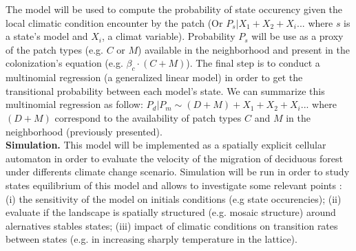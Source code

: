 The model will be used to compute the probability of state occurency given the
local climatic condition encounter by the patch (Or $P_{s}|X_1+X_2+X_i...$
where $s$ is a state's model and $X_i$, a climat variable). Probability $P_s$
will be use as a proxy of the patch types (e.g. $C$ or $M$) available in the
neighborhood and present in the colonization's equation (e.g. $\beta_c \cdot
(C+M)$). The final step is to conduct a multinomial regression (a generalized
linear model) in order to get the transitional probability between each
model's state. We can summarize this multinomial regression as follow:
$P_{d}|P_{m} \sim (D+M) + X_1+X_2+X_i... $ where $(D+M)$ correspond to the
availability of patch types $C$ and $M$ in the neighborhood (previously
presented).\\



\textbf{Simulation.} This model will be implemented as a spatially explicit
cellular automaton in order to evaluate the velocity of the
migration of deciduous forest under differents climate change scenario.
Simulation will be run in order to study states equilibrium of this model and
allows to investigate some relevant points : (i) the sensitivity of
the model on initials conditions (e.g state occurencies); (ii) evaluate if the
landscape is spatially structured (e.g. mosaic structure) around alernatives
stables states; (iii) impact of climatic conditions on transition rates
between states (e.g. in increasing sharply temperature in the lattice). \\


